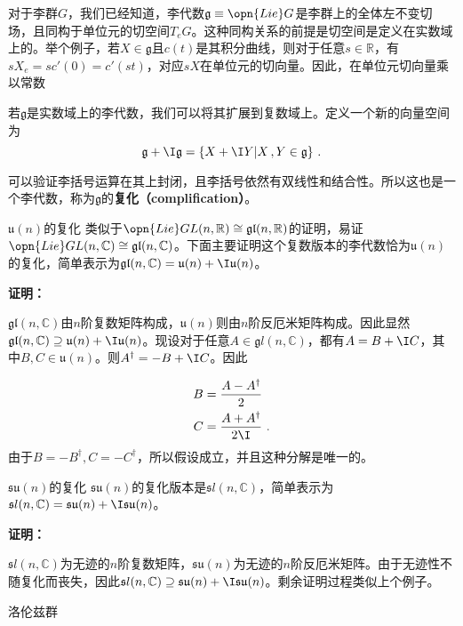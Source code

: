 
对于李群$G$，我们已经知道，李代数$\mathfrak g\equiv \opn{Lie} G$是李群上的全体左不变切场，且同构于单位元的切空间$T_e G$。这种同构关系的前提是切空间是定义在实数域上的。举个例子，若$X\in \mathfrak g$且$c(t)$是其积分曲线，则对于任意$s\in\mathbb R$，有$sX_e=sc'(0)=c'(st)$，对应$sX$在单位元的切向量。因此，在单位元切向量乘以常数
\begin{definition}{}
若$\mathfrak g$是实数域上的李代数，我们可以将其扩展到复数域上。定义一个新的向量空间为
\begin{equation}
\mathfrak g+\I \mathfrak g=\{X+\I Y|X\,,Y\in\mathfrak g\}~.
\end{equation}
\end{definition}
可以验证李括号运算在其上封闭，且李括号依然有双线性和结合性。所以这也是一个李代数，称为$\mathfrak g$的\textbf{复化（complification）}。
\begin{example}{$\mathfrak u(n)$的复化}
类似于$\opn{Lie}GL(n,\mathbb R)\cong \mathfrak{gl}(n,\mathbb R)$的证明，易证$\opn{Lie}GL(n,\mathbb C)\cong \mathfrak{gl}(n,\mathbb C)$。下面主要证明这个复数版本的李代数恰为$\mathfrak u(n)$的复化，简单表示为$\mathfrak{gl}(n,\mathbb C)=\mathfrak u(n)+\I \mathfrak u(n)$。

\textbf{证明：}

$\mathfrak{gl}(n,\mathbb C)$由$n$阶复数矩阵构成，$\mathfrak u(n)$则由$n$阶反厄米矩阵构成。因此显然$\mathfrak{gl}(n,\mathbb C)\supseteq \mathfrak u(n)+\I \mathfrak u(n)$。现设对于任意$A\in \mathfrak gl(n,\mathbb C)$，都有$A=B+\I C$，其中$B,C\in \mathfrak u(n)$。则$A^{\dagger}=-B+\I C$。因此

\begin{equation}
\begin{aligned}
B&=\frac{A-A^{\dagger}}{2}\\
C&= \frac{A+A^{\dagger}}{2\I}~.
\end{aligned}
\end{equation}
由于$B=-B^{\dagger},C=-C^{\dagger}$，所以假设成立，并且这种分解是唯一的。

\end{example}
\begin{example}{$\mathfrak {su}(n)$的复化}
$\mathfrak {su}(n)$的复化版本是$\mathfrak sl(n,\mathbb C)$，简单表示为$\mathfrak sl(n,\mathbb C)=\mathfrak {su}(n)+\I \mathfrak {su}(n)$。

\textbf{证明：}

$\mathfrak sl(n,\mathbb C)$为无迹的$n$阶复数矩阵，$\mathfrak {su}(n)$为无迹的$n$阶反厄米矩阵。由于无迹性不随复化而丧失，因此$\mathfrak sl(n,\mathbb C)\supseteq \mathfrak {su}(n)+\I \mathfrak {su}(n)$。剩余证明过程类似上个例子。
\end{example}
\begin{example}{洛伦兹群}

\end{example}